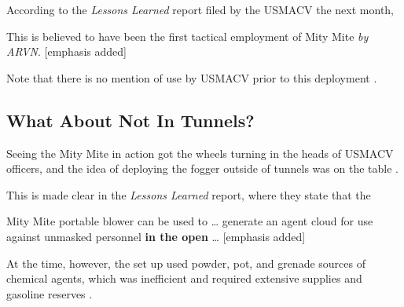 \documentclass[
  11pt,
]{krantz}
\renewenvironment{quote}{\begin{VF}}{\end{VF}}
\begin{document}
According to the \emph{Lessons Learned} report filed by the USMACV the next month,

\begin{quote}
This is believed to have been the first tactical employment of Mity Mite \emph{by ARVN}. {[}emphasis added{]}

\end{quote}

Note that there is no mention of use by USMACV prior to this deployment \citep{USMACV1965}.

\hypertarget{what-about-not-in-tunnels}{%
\subsection*{What About Not In Tunnels?}\label{what-about-not-in-tunnels}}


Seeing the Mity Mite in action got the wheels turning in the heads of USMACV officers, and the idea of deploying the fogger outside of tunnels was on the table \citep{USMACV1965}.

This is made clear in the \emph{Lessons Learned} report, where they state that the

\begin{quote}
Mity Mite portable blower can be used to \ldots{} generate an agent cloud for use against unmasked personnel \textbf{in the open} \ldots{} {[}emphasis added{]}

\end{quote}

At the time, however, the set up used powder, pot, and grenade sources of chemical agents, which was inefficient and required extensive supplies and gasoline reserves \citep{USMACV1965}.
\end{document}
